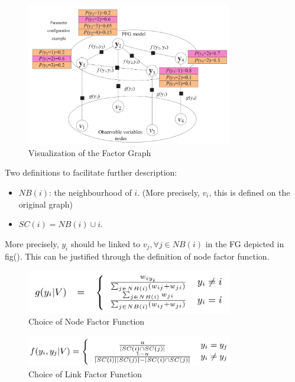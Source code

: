 \documentclass[11pt,a4paper]{article}
\begin{document}
\begin{figure}[htb]
\centering
	\includegraphics[width=0.8\textwidth]{fig/wang2011-FG-vis.png}
	\caption{Visualization of the Factor Graph}
\end{figure}

Two definitions to facilitate further description:
\begin{itemize}
	\item $NB(i)$: the neighbourhood of $i$. (More precisely, 
	$v_i$, this is defined on the original graph)
	\item $SC(i) = NB(i) \cup i$. 
\end{itemize} 

More precisely, $y_i$ should be linked to $v_j, \forall j \in NB(i)$
in the FG depicted in fig(). This can be justified through the definition
of node factor function. 

\begin{figure}[htb]
\centering
	\includegraphics[width=0.8\textwidth]{fig/wang2011-nodefactor.png}
	\caption{Choice of Node Factor Function}
\end{figure}

\begin{figure}[htb]
\centering
	\includegraphics[width=0.8\textwidth]{fig/wang2011-edgefactor.png}
	\caption{Choice of Link Factor Function}
\end{figure}
\end{document}
